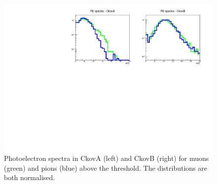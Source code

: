 \begin{figure}[htb!]
  \begin{center}
    \includegraphics[width=0.85\columnwidth]{./03-Ckov/Figures/Ckov_photoelectrons_spectra.pdf}
    \caption{Photoelectron spectra in CkovA (left) and CkovB (right) for muons (green) and pions (blue) above the threshold. The distributions are both normalised.}
    \label{fig:ckov3}
  \end{center}
\end{figure}
